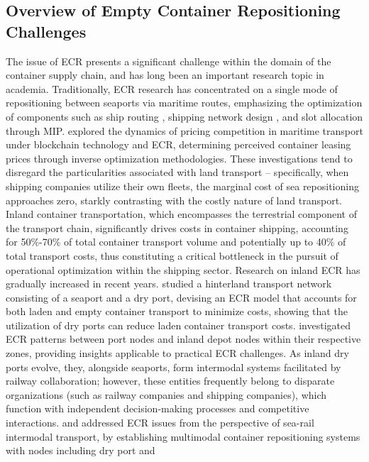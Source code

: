 \documentclass[preprint,12pt]{elsarticle}
\begin{document}
\subsection{Overview of Empty Container Repositioning Challenges}

The issue of ECR presents a significant challenge within the domain of the container supply chain, and has long been an important research topic in academia. Traditionally, ECR research has concentrated on a single mode of repositioning between seaports via maritime routes, emphasizing the optimization of components such as ship routing \citep{xiangLinerFleetDeployment2024,xiangTacticalVesselDeployment2024,xuEmptyContainerRepositioning2024}, shipping network design \citep{kuzmiczContainerDepotLocation2020, shanExactAlgorithmInland2020, zhangTacticalOperationalCooperative2019}, and slot allocation \citep{liangDynamicContainerSlot2024} through MIP. \citet{yuPricingCompetitionMaritime2024} explored the dynamics of pricing competition in maritime transport under blockchain technology and ECR, determining perceived container leasing prices through inverse optimization methodologies. These investigations tend to disregard the particularities associated with land transport – specifically, when shipping companies utilize their own fleets, the marginal cost of sea repositioning approaches zero, starkly contrasting with the costly nature of land transport. Inland container transportation, which encompasses the terrestrial component of the transport chain, significantly drives costs in container shipping, accounting for 50\%-70\% of total container transport volume and potentially up to 40\% of total transport costs, thus constituting a critical bottleneck in the pursuit of operational optimization within the shipping sector. Research on inland ECR has gradually increased in recent years. \citet{faziMultitripContainerDrayage2023} studied a hinterland transport network consisting of a seaport and a dry port, devising an ECR model that accounts for both laden and empty container transport to minimize costs, showing that the utilization of dry ports can reduce laden container transport costs. \citet{caiJointOptimizationEmpty2024} investigated ECR patterns between port nodes and inland depot nodes within their respective zones, providing insights applicable to practical ECR challenges. As inland dry ports evolve, they, alongside seaports, form intermodal systems facilitated by railway collaboration; however, these entities frequently belong to disparate organizations (such as railway companies and shipping companies), which function with independent decision-making processes and competitive interactions. \citet{luoEmptyContainerRepositioning2019} and \citet{xieEmptyContainerManagement2017} addressed ECR issues from the perspective of sea-rail intermodal transport, by establishing multimodal container repositioning systems with nodes including dry port and 
\end{document}
